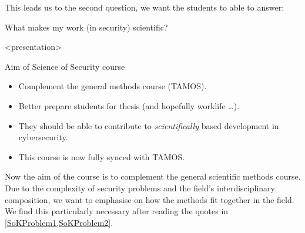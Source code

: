 This leads us to the second question, we want the students to able to answer:

\begin{frame}
  \begin{question}
    What makes my work (in security) scientific?
  \end{question}
\end{frame}

\begin{frame}<presentation>
  \begin{block}{Aim of Science of Security course}
    \begin{itemize}
      \item Complement the general methods course (TAMOS).
      \item Better prepare students for thesis (and hopefully worklife \dots).
      \item They should be able to contribute to \emph{scientifically} based 
        development in cybersecurity.
    \end{itemize}
  \end{block}

  \begin{remark}
    \begin{itemize}
      \item This course is now fully synced with TAMOS\@.
    \end{itemize}
  \end{remark}
\end{frame}


Now the aim of the course is to complement the general scientific methods 
course.
Due to the complexity of security problems and the field's interdisciplinary 
composition, we want to emphasise on how the methods fit together in the field.
We find this particularly necessary after reading the quotes in 
\cref{SoKProblem1,SoKProblem2}.

